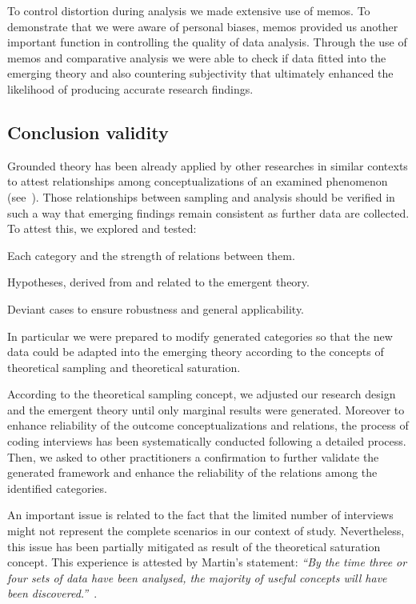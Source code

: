 \documentclass[10pt,journal,letterpaper,compsoc]{IEEEtran}
\begin{document}
To control distortion during analysis we made extensive use of memos. To
demonstrate that we were aware of personal biases, memos provided us another
important function in controlling the quality of data analysis. Through the use
of memos and comparative analysis we were able to check if data fitted into the
emerging theory and also countering subjectivity that ultimately enhanced the
likelihood of producing accurate research findings.

\subsection{Conclusion validity}

Grounded theory has been already applied by other researches in similar
contexts to attest relationships among conceptualizations of an examined
phenomenon (see~\cite{Coleman2007, Basri, Coleman2008a}). Those relationships
between sampling and analysis should be verified in such a way that emerging
findings remain consistent as further data are collected. To attest this, we
explored and tested:

\begin{compactitem} 
  \item Each category and the strength of relations between them. 
  \item Hypotheses, derived from and related to the emergent theory. 
  \item Deviant cases to ensure robustness and general applicability. 
\end{compactitem}

In particular we were prepared to modify generated categories so that the new
data could be adapted into the emerging theory according to the concepts of
theoretical sampling and theoretical saturation.

According to the theoretical sampling concept, we adjusted our research design
and the emergent theory until only marginal results were generated. Moreover to
enhance reliability of the outcome conceptualizations and relations, the
process of coding interviews has been systematically conducted following a
detailed process. Then, we asked to other practitioners a confirmation to
further validate the generated framework and enhance the reliability of the
relations among the identified categories.

An important issue is related to the fact that the limited number of interviews
might not represent the complete scenarios in our context of study.
Nevertheless, this issue has been partially mitigated as result of the
theoretical saturation concept. This experience is attested by Martin's
statement: \textit{``By the time three or four sets of data have been analysed,
the majority of useful concepts will have been 
discovered.''}~\cite{giardinoEtAl}.
\end{document}

